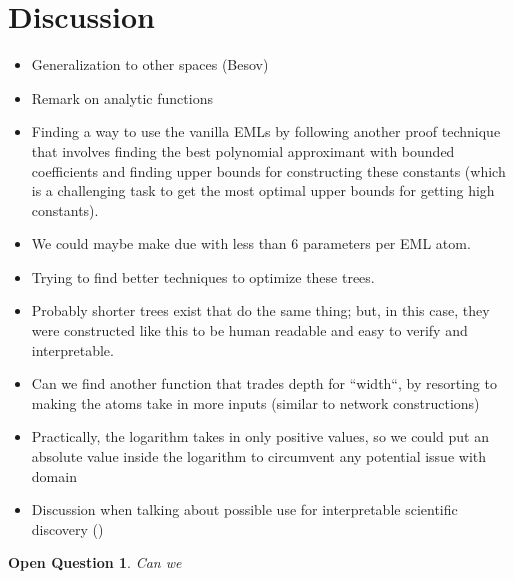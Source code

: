 \documentclass{article}
\numberwithin{Def}{section}
\newtheorem{openquestion}{Open Question}
\begin{document}
\section{Discussion}
\begin{itemize}
    \item Generalization to other spaces (Besov)
    \item Remark on analytic functions
    \item Finding a way to use the vanilla EMLs by following another proof technique that involves finding the best polynomial approximant with bounded coefficients and finding upper bounds for constructing these constants (which is a challenging task to get the most optimal upper bounds for getting high constants).
    \item We could maybe make due with less than $6$ parameters per EML atom. 
    \item Trying to find better techniques to optimize these trees.
    \item Probably shorter trees exist that do the same thing; but, in this case, they were constructed like this to be human readable and easy to verify and interpretable.
    \item Can we find another function that trades depth for ``width``, by resorting to making the atoms take in more inputs (similar to network constructions)
    \item Practically, the logarithm takes in only positive values, so we could put an absolute value inside the logarithm to circumvent any potential issue with domain 
    \item Discussion when talking about possible use for interpretable scientific discovery (\cite{wyder2025common, yermakov2025seismic})
\end{itemize}

\begin{openquestion}
    Can we 
\end{openquestion}
\end{document}
